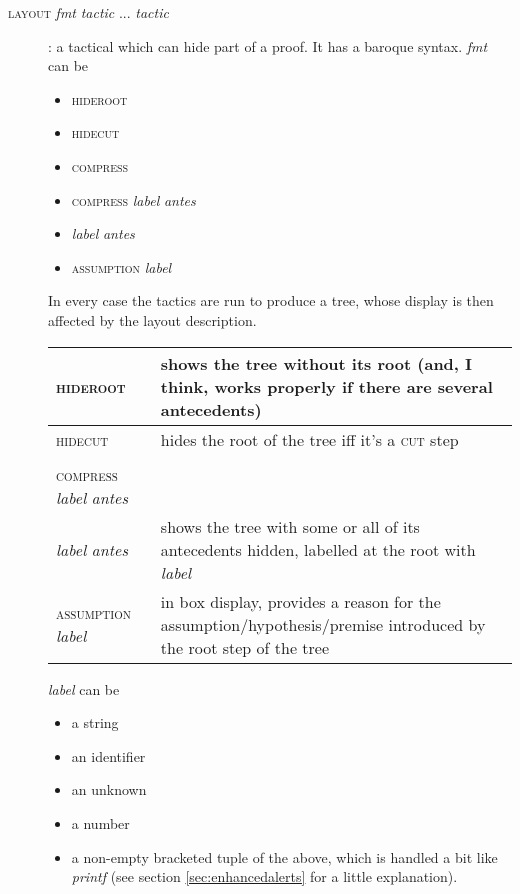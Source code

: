 \begin{description}
\item [\textsc{layout} \textit{fmt} \textit{tactic} ... \textit{tactic}]: a tactical which can hide part of a proof. It has a baroque syntax. \textit{fmt} can be 
\begin{itemize}
\item \textsc{hideroot}
\item \textsc{hidecut} 
\item \textsc{compress}
\item \textsc{compress} \textit{label} \textit{antes}
\item \textit{label} \textit{antes}
\item \textsc{assumption} \textit{label}
\end{itemize}
In every case the tactics are run to produce a tree, whose display is then affected by the layout description. 
\hspace{10pt}\begin{longtable}{|l|p{280pt}|} \hline
\textsc{hideroot} & 
{\raggedright shows the tree without its root (and, I think, works properly if there are several antecedents)} \\ \hline
\textsc{hidecut} &
{\raggedright hides the root of the tree iff it's a \textsc{cut} step} \\ \hline
\hspace{-6pt}\begin{tabular}{l}
\textsc{compress} \\
\textsc{compress} \textit{label} \textit{antes} \\
\textit{label} \textit{antes}
\end{tabular}
 &
 {\raggedright shows the tree with some or all of its antecedents hidden, labelled at the root with \textit{label}} \\ \hline
\textsc{assumption} \textit{label} & 
{\raggedright in box display, provides a reason for the assumption/hypothesis/premise introduced by the root step of the tree} \\ \hline
\end{longtable}

\textit{label} can be \begin{itemize}
\item a string
\item an identifier
\item an unknown
\item a number 
\item a non-empty bracketed tuple of the above, which is handled a bit like \textit{printf} (see section \ref{sec:enhancedalerts} for a little explanation).
\end{itemize}


\end{description}
